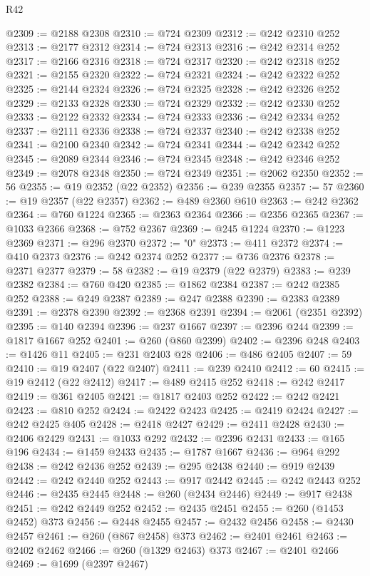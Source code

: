 \begin{lexlean}{R42}
\begin{coremodule}
{@2309 := @2188 @2308
@2310 := @724 @2309
@2312 := @242 @2310 @252
@2313 := @2177 @2312
@2314 := @724 @2313
@2316 := @242 @2314 @252
@2317 := @2166 @2316
@2318 := @724 @2317
@2320 := @242 @2318 @252
@2321 := @2155 @2320
@2322 := @724 @2321
@2324 := @242 @2322 @252
@2325 := @2144 @2324
@2326 := @724 @2325
@2328 := @242 @2326 @252
@2329 := @2133 @2328
@2330 := @724 @2329
@2332 := @242 @2330 @252
@2333 := @2122 @2332
@2334 := @724 @2333
@2336 := @242 @2334 @252
@2337 := @2111 @2336
@2338 := @724 @2337
@2340 := @242 @2338 @252
@2341 := @2100 @2340
@2342 := @724 @2341
@2344 := @242 @2342 @252
@2345 := @2089 @2344
@2346 := @724 @2345
@2348 := @242 @2346 @252
@2349 := @2078 @2348
@2350 := @724 @2349
@2351 := @2062 @2350
@2352 := 56
@2355 := @19 @2352 (@22 @2352)
@2356 := @239 @2355
@2357 := 57
@2360 := @19 @2357 (@22 @2357)
@2362 := @489 @2360 @610
@2363 := @242 @2362
@2364 := @760 @1224
@2365 := @2363 @2364
@2366 := @2356 @2365
@2367 := @1033 @2366
@2368 := @752 @2367
@2369 := @245 @1224
@2370 := @1223 @2369
@2371 := @296 @2370
@2372 := "0"
@2373 := @411 @2372
@2374 := @410 @2373
@2376 := @242 @2374 @252
@2377 := @736 @2376
@2378 := @2371 @2377
@2379 := 58
@2382 := @19 @2379 (@22 @2379)
@2383 := @239 @2382
@2384 := @760 @420
@2385 := @1862 @2384
@2387 := @242 @2385 @252
@2388 := @249 @2387
@2389 := @247 @2388
@2390 := @2383 @2389
@2391 := @2378 @2390
@2392 := @2368 @2391
@2394 := @2061 (@2351 @2392)
@2395 := @140 @2394
@2396 := @237 @1667
@2397 := @2396 @244
@2399 := @1817 @1667 @252
@2401 := @260 (@860 @2399)
@2402 := @2396 @248
@2403 := @1426 @11
@2405 := @231 @2403 @28
@2406 := @486 @2405
@2407 := 59
@2410 := @19 @2407 (@22 @2407)
@2411 := @239 @2410
@2412 := 60
@2415 := @19 @2412 (@22 @2412)
@2417 := @489 @2415 @252
@2418 := @242 @2417
@2419 := @361 @2405
@2421 := @1817 @2403 @252
@2422 := @242 @2421
@2423 := @810 @252
@2424 := @2422 @2423
@2425 := @2419 @2424
@2427 := @242 @2425 @405
@2428 := @2418 @2427
@2429 := @2411 @2428
@2430 := @2406 @2429
@2431 := @1033 @292
@2432 := @2396 @2431
@2433 := @165 @196
@2434 := @1459 @2433
@2435 := @1787 @1667
@2436 := @964 @292
@2438 := @242 @2436 @252
@2439 := @295 @2438
@2440 := @919 @2439
@2442 := @242 @2440 @252
@2443 := @917 @2442
@2445 := @242 @2443 @252
@2446 := @2435 @2445
@2448 := @260 (@2434 @2446)
@2449 := @917 @2438
@2451 := @242 @2449 @252
@2452 := @2435 @2451
@2455 := @260 (@1453 @2452) @373
@2456 := @2448 @2455
@2457 := @2432 @2456
@2458 := @2430 @2457
@2461 := @260 (@867 @2458) @373
@2462 := @2401 @2461
@2463 := @2402 @2462
@2466 := @260 (@1329 @2463) @373
@2467 := @2401 @2466
@2469 := @1699 (@2397 @2467)
}
\end{coremodule}
\end{lexlean}
